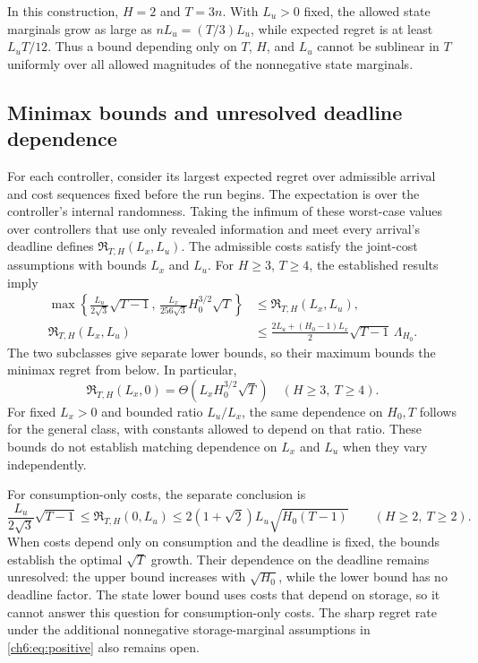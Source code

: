 \documentclass[11pt]{article}
\theoremstyle{plain}
\theoremstyle{remark}
\numberwithin{equation}{section}
\begin{document}
In this construction, $H=2$ and $T=3n$. With $L_u>0$ fixed, the allowed
state marginals grow as large as $nL_u=(T/3)L_u$, while expected regret is
at least $L_uT/12$. Thus a bound depending only on $T$, $H$, and $L_u$
cannot be sublinear in $T$ uniformly over all allowed magnitudes of the
nonnegative state marginals.

\subsection{Minimax bounds and unresolved deadline dependence}
For each controller, consider its largest expected regret over admissible
arrival and cost sequences fixed before the run begins. The expectation
is over the controller's internal randomness. Taking the infimum of
these worst-case values over controllers that use only revealed
information and meet every arrival's deadline defines
$\mathfrak R_{T,H}(L_x,L_u)$. The admissible costs satisfy the joint-cost
assumptions with bounds $L_x$ and $L_u$.
For $H\ge3$, $T\ge4$, the established results imply
\begin{equation}\label{ch6:eq:minimax-sandwich}
 \begin{split}
 \max\left\{\frac{L_u}{2\sqrt3}\sqrt{T-1},\,
 \frac{L_x}{256\sqrt3}H_0^{3/2}\sqrt T\right\}
 &\le\mathfrak R_{T,H}(L_x,L_u),\\
 \mathfrak R_{T,H}(L_x,L_u)
 &\le\frac{2L_u+(H_0-1)L_x}{2}
 \sqrt{T-1}\,\Lambda_{H_0}.
 \end{split}
\end{equation}
The two subclasses give separate lower bounds, so their maximum bounds
the minimax regret from below.
In particular,
\begin{equation}\label{ch6:eq:state-minimax}
 \mathfrak R_{T,H}(L_x,0)
 =\Theta(L_xH_0^{3/2}\sqrt T)
 \quad(H\ge3,\ T\ge4).
\end{equation}
For fixed $L_x>0$ and bounded ratio $L_u/L_x$, the same dependence on
$H_0,T$ follows for the general class, with constants allowed to depend
on that ratio. These bounds do not establish matching dependence on
$L_x$ and $L_u$ when they vary independently.

For consumption-only costs, the separate conclusion is
\begin{equation}\label{ch6:eq:action-gap}
 \frac{L_u}{2\sqrt3}\sqrt{T-1}
 \le\mathfrak R_{T,H}(0,L_u)
 \le2(1+\sqrt2)L_u\sqrt{H_0(T-1)}
 \qquad(H\ge2,\ T\ge2).
\end{equation}
When costs depend only on consumption and the deadline is fixed, the
bounds establish the optimal $\sqrt T$ growth. Their dependence on the
deadline remains unresolved: the upper bound increases with
$\sqrt{H_0}$, while the lower bound has no deadline factor. The state
lower bound uses costs that depend on storage, so it cannot answer this
question for consumption-only costs. The sharp regret rate under the
additional nonnegative storage-marginal assumptions in
\eqref{ch6:eq:positive} also remains open.
\end{document}
